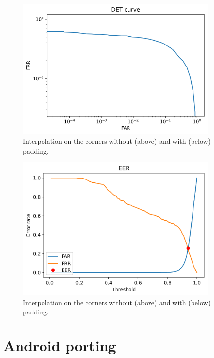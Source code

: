 \documentclass{article}
\begin{document}
\blindtext

\begin{figure}[H]
    \label{fig:det}
    \begin{center}
        \includegraphics[width=10cm,keepaspectratio]{images/det.png}
        \caption{Interpolation on the corners without (above) and with (below) padding.}
    \end{center}
\end{figure}

\blindtext

\begin{figure}[H]
    \label{fig:eer}
    \begin{center}
        \includegraphics[width=10cm,keepaspectratio]{images/eer.png}
        \caption{Interpolation on the corners without (above) and with (below) padding.}
    \end{center}
\end{figure}

\blindtext

\section{Android porting}
\end{document}
